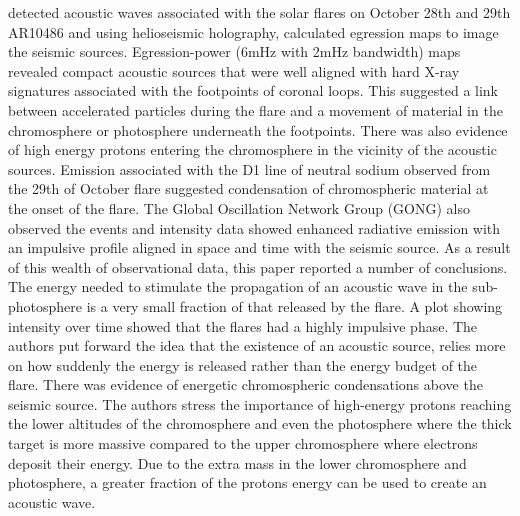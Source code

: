\cite{2005ApJ...630.1168D} detected acoustic waves associated with the solar flares on October 28th and 29th AR10486 and using helioseismic holography, calculated egression maps to image the seismic sources. Egression-power (6mHz with 2mHz bandwidth) maps revealed compact acoustic sources that were well aligned with hard X-ray signatures associated with the footpoints of coronal loops. This suggested a link between accelerated particles during the flare and a movement of material in the chromosphere or photosphere underneath the footpoints. There was also evidence of high energy protons entering the chromosphere in the vicinity of the acoustic sources. Emission associated with the D1 line of neutral sodium observed from the 29th of October flare suggested condensation of chromospheric material at the onset of the flare. The Global Oscillation Network Group (GONG) also observed the events and intensity data showed enhanced radiative emission with an impulsive profile aligned in space and time with the seismic source. As a result of this wealth of observational data, this paper reported a number of conclusions. The energy needed to stimulate the propagation of an acoustic wave in the sub-photosphere is a very small fraction of that released by the flare. A plot showing intensity over time showed that the flares had a highly impulsive phase. The authors put forward the idea that the existence of an acoustic source, relies more on how suddenly the energy is released rather than the energy budget of the flare. There was evidence of energetic chromospheric condensations above the seismic source. The authors stress the importance of high-energy protons reaching the lower altitudes of the chromosphere and even the photosphere where the thick target is more massive compared to the upper chromosphere where electrons deposit their energy. Due to the extra mass in the lower chromosphere and photosphere, a greater fraction of the protons energy can be used to create an acoustic wave.  \\


